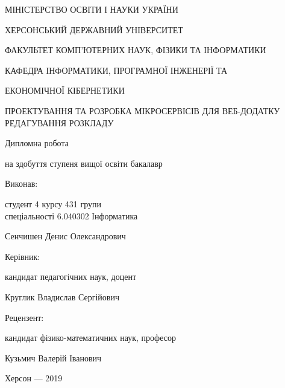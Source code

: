 \thispagestyle{empty}

{\centering
МІНІСТЕРСТВО ОСВІТИ І НАУКИ УКРАЇНИ

ХЕРСОНСЬКИЙ ДЕРЖАВНИЙ УНІВЕРСИТЕТ

ФАКУЛЬТЕТ КОМП'ЮТЕРНИХ НАУК, ФІЗИКИ ТА ІНФОРМАТИКИ

КАФЕДРА ІНФОРМАТИКИ, ПРОГРАМНОЇ ІНЖЕНЕРІЇ ТА 

ЕКОНОМІЧНОЇ КІБЕРНЕТИКИ

\vfill

ПРОЕКТУВАННЯ ТА РОЗРОБКА МІКРОСЕРВІСІВ ДЛЯ ВЕБ-ДОДАТКУ РЕДАГУВАННЯ РОЗКЛАДУ

Дипломна робота

на здобуття ступеня вищої освіти бакалавр

}

\vfill

\hfill\begin{minipage}[t]{0.65\textwidth}
Виконав: 

студент 4 курсу 431 групи \\ спеціальності 6.040302  Інформатика

Сенчишен Денис Олександрович

Керівник:

кандидат педагогічних наук, доцент

Круглик Владислав Сергійович

Рецензент:

кандидат фізико-математичних наук, професор

Кузьмич Валерій Іванович

\end{minipage}

\vfill

{\centering
Херсон --- 2019

}